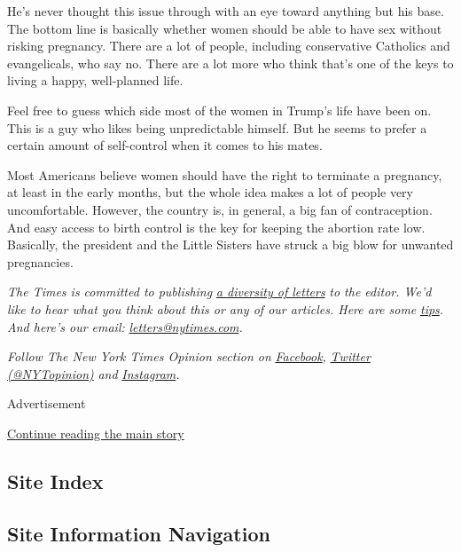 He's never thought this issue through with an eye toward anything but
his base. The bottom line is basically whether women should be able to
have sex without risking pregnancy. There are a lot of people, including
conservative Catholics and evangelicals, who say no. There are a lot
more who think that's one of the keys to living a happy, well-planned
life.

Feel free to guess which side most of the women in Trump's life have
been on. This is a guy who likes being unpredictable himself. But he
seems to prefer a certain amount of self-control when it comes to his
mates.

Most Americans believe women should have the right to terminate a
pregnancy, at least in the early months, but the whole idea makes a lot
of people very uncomfortable. However, the country is, in general, a big
fan of contraception. And easy access to birth control is the key for
keeping the abortion rate low. Basically, the president and the Little
Sisters have struck a big blow for unwanted pregnancies.

\emph{The Times is committed to publishing}
\href{https://www.nytimes.com/2019/01/31/opinion/letters/letters-to-editor-new-york-times-women.html}{\emph{a
diversity of letters}} \emph{to the editor. We'd like to hear what you
think about this or any of our articles. Here are some}
\href{https://help.nytimes.com/hc/en-us/articles/115014925288-How-to-submit-a-letter-to-the-editor}{\emph{tips}}\emph{.
And here's our email:}
\href{mailto:letters@nytimes.com}{\emph{letters@nytimes.com}}\emph{.}

\emph{Follow The New York Times Opinion section on}
\href{https://www.facebook.com/nytopinion}{\emph{Facebook}}\emph{,}
\href{http://twitter.com/NYTOpinion}{\emph{Twitter (@NYTopinion)}}
\emph{and}
\href{https://www.instagram.com/nytopinion/}{\emph{Instagram}}\emph{.}

Advertisement

\protect\hyperlink{after-bottom}{Continue reading the main story}

\hypertarget{site-index}{%
\subsection{Site Index}\label{site-index}}

\hypertarget{site-information-navigation}{%
\subsection{Site Information
Navigation}\label{site-information-navigation}}

